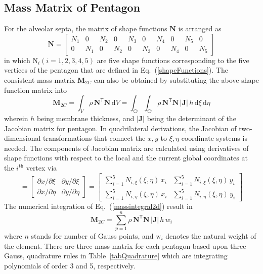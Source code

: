\subsection{Mass Matrix of Pentagon}
For the alveolar septa, the matrix of shape functions $\mathbf{N}$ is arranged as
 \begin{equation}
	\mathbf{N} = 
	\begin{bmatrix}
	N_1 & 0 & N_2 & 0 & N_3 & 0 & N_4 & 0 & N_5 & 0 \\ 0 & N_1 & 0 & N_2 & 0 & N_3 & 0 & N_4 & 0 & N_5 
\end{bmatrix} 
	\label{shape2D}
\end{equation}
in which $\mathrm{N}_i (i = 1, 2, 3, 4, 5)$ are five shape functions corresponding to the five vertices of the pentagon that are defined in Eq.~(\ref{shapeFunctions}).
The consistent mass matrix $\mathbf{M}_{2C}$ can also be obtained by substituting the above shape function matrix into 
\begin{equation}
    \mathbf{M}_{2C} = \int_{V} \rho \, \mathbf{N}^{\mathsf{T}} \mathbf{N} \, \mathrm{d} V = \int_{\pentagon} \int_{\pentagon} \rho \, \mathbf{N}^{\mathsf{T}} \mathbf{N} \,|\mathbf{J}| \, h \, \mathrm{d} \xi \, \mathrm{d} \eta
    \label{massintegral2d}
\end{equation}
wherein $h$ being membrane thickness, and $|\mathbf{J}|$ being the determinant of the Jacobian matrix for pentagon. 
In quadrilateral derivations,  the Jacobian of two-dimensional transformations that connect the ${x, y}$ to ${\xi, \eta}$ coordinate systems is needed. The components of Jacobian matrix are calculated using derivatives of shape functions with respect to the local and the current global coordinates at the $i^{\mathrm{th}}$ vertex via
\begin{equation}
[\mathbf{J}] = 
\begin{bmatrix}
\partial x / \partial\xi & \partial y / \partial\xi \\
\partial x / \partial\eta & \partial y / \partial\eta 
\end{bmatrix}  
= \begin{bmatrix}
\sum\nolimits_{i=1}^5 N_{i,\xi} (\xi,\eta) \, x_i & \sum\nolimits_{i=1}^5 N_{i,\xi} (\xi,\eta) \, y_i \\
\sum\nolimits_{i=1}^5 N_{i,\eta} (\xi,\eta) \, x_i & \sum\nolimits_{i=1}^5 N_{i,\eta} (\xi,\eta) \, y_i
\end{bmatrix}
\label{jacobianpent}
\end{equation}
The numerical integration of Eq.~(\ref{massintegral2d}) result in 
\begin{equation}
    \mathbf{M}_{2C} = \sum_{p=1}^{n} \rho \, \mathbf{N}^{\mathsf{T}} \mathbf{N} \,|\mathbf{J}| \, h \, w_i
\end{equation}
where $n$ stands for number of Gauss points, and $\mathrm{w}_i$ denotes the natural weight of the element.
There are three mass matrix for each pentagon based upon three Gauss, quadrature rules in Table~\ref{tabQuadrature} which are integrating polynomials of order 3 and 5, respectively. 


